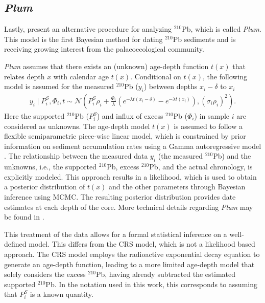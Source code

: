 \documentclass [10pt] {article}
\newcommand{\ac}{\color{red} }  %
\newcommand{\ca}{\color{black}} %
\begin{document}


\subsection{\textit{Plum}}

Lastly, \citet{Aquino2018} present an alternative procedure for analyzing  $^{210}$Pb, which is called \textit{Plum}.
This model is the first Bayesian method for dating $^{210}$Pb sediments and is receiving growing interest from the palaeoecological community.%

\textit{Plum} assumes that there exists an (unknown) age-depth function $t(x)$ that relates depth $x$ with calendar age $t(x)$. 
Conditional on $t(x)$, the following model is assumed for the measured $^{210}$Pb ($y_i$) between depths $x_i - \delta$ to $x_i$
\begin{eqnarray}
y_i \mid P^S_i, \Phi_i, t \sim \mathcal{N} \left(P^S_i \rho_i +\frac{\Phi_i}{\lambda} \left( e^{-\lambda t(x_i-\delta)} - e^{-\lambda t(x_i)} \right), (\sigma_i\rho_i)^2 \right). 
\end{eqnarray}
Here the supported $^{210}$Pb ($P_i^S$) and influx of excess $^{210}$Pb ($\Phi_i$) in sample $i$ are considered as unknowns. The age-depth model $t(x)$ is assumed to follow a flexible semiparametric piece-wise linear model, which is constrained by prior information on sediment accumulation rates using a Gamma autoregressive model \citep{Blaauw2011}. The relationship between the measured data $y_i$ (the measured $^{210}$Pb) and the unknowns, i.e., the supported $^{210}$Pb, excess $^{210}$Pb, and the actual chronology, is explicitly modeled. This approach results in a likelihood, which is used to obtain a posterior distribution of $t(x)$ and the other parameters through Bayesian inference using MCMC. The resulting posterior distribution provides date estimates at each depth of the core. More technical details regarding \textit{Plum} may be found in \citep{Aquino2018}.

This treatment of the data allows for a formal statistical inference on a well-defined model. This differs from the CRS model, which is not a likelihood based approach. The CRS model employs the radioactive exponential decay equation to generate an age-depth function, leading to a more limited age-depth model that solely considers the excess $^{210}$Pb, having already subtracted the estimated supported $^{210}$Pb. In the notation used in this work, this corresponds to assuming that $P^S_i$ is a known quantity.
\end{document}
